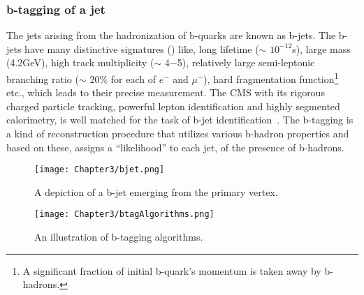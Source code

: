 \subsubsection{b-tagging of a jet}\label{Se:Jet_btagging}
The jets arising from the hadronization of b-quarks are known as b-jets. The b-jets have many distinctive signatures (\fig{\ref{fig:bjet}}) like,
long lifetime ($\sim$ $10^{-12}$\unit{s}),
large mass (4.2\unit{GeV}), high track multiplicity ($\sim$ 4$-$5), relatively large semi-leptonic branching ratio ($\sim$ 20$\%$ for each of $e^{-}$ and $\mu^{-}$), hard
fragmentation function\footnote{A significant fraction of initial b-quark's momentum is taken away by b-hadrons.} etc., which leads to their precise
measurement. The CMS with its rigorous charged particle tracking, powerful lepton identification and highly segmented calorimetry, is well matched for the task
of b-jet identification~\cite{Chatrchyan:2012jua, Sirunyan:2017ezt}. The b-tagging is a kind of reconstruction procedure that utilizes 
various b-hadron properties and based on these, assigns a ``likelihood'' to each jet, of the presence of b-hadrons.
\begin{figure}[h]
\begin{center}
\texttt{[image: Chapter3/bjet.png]}
\caption{A depiction of a b-jet emerging from the primary vertex.}
\label{fig:bjet}
\end{center}
\end{figure}


\begin{figure}[h]
\begin{center}
\texttt{[image: Chapter3/btagAlgorithms.png]}
\caption{An illustration of b-tagging algorithms.}
\label{fig:bjetAlgo}
\end{center}
\end{figure}

